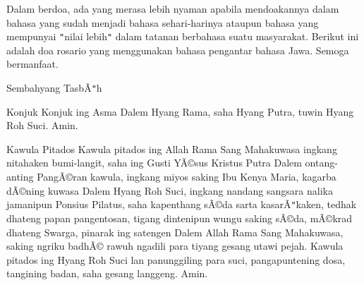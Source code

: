 





Dalam berdoa, ada yang merasa lebih nyaman apabila mendoakannya dalam bahasa yang sudah menjadi bahasa sehari-harinya ataupun bahasa yang mempunyai \texttt{{}"{}}nilai lebih\texttt{{}"{}} dalam tatanan berbahasa suatu masyarakat. Berikut ini adalah doa rosario yang menggunakan bahasa pengantar bahasa Jawa. Semoga bermanfaat.\newline





Sembahyang Tasb\~A\texttt{{}"{}}h



\newline

Konjuk
\newline
Konjuk ing Asma Dalem Hyang Rama, saha Hyang Putra, tuwin Hyang Roh Suci. Amin.\newline

Kawula Pitados
\newline
Kawula pitados ing Allah Rama Sang Mahakuwasa ingkang nitahaken bumi-langit, saha ing Gusti Y\~A\copyright{}sus Kristus Putra Dalem ontang-anting Pang\~A\copyright{}ran kawula, ingkang miyos saking Ibu Kenya Maria, kagarba d\~A\copyright{}ning kuwasa Dalem Hyang Roh Suci, ingkang nandang sangsara nalika jamanipun Ponsius Pilatus, saha kapenthang s\~A\copyright{}da sarta kasar\~A\texttt{{}"{}}kaken, tedhak dhateng papan pangentosan, tigang dintenipun wungu saking s\~A\copyright{}da, m\~A\copyright{}krad dhateng Swarga, pinarak ing satengen Dalem Allah Rama Sang Mahakuwasa, saking ngriku badh\~A\copyright{} rawuh ngadili para tiyang gesang utawi pejah. Kawula pitados ing Hyang Roh Suci lan panunggiling para suci, pangapuntening dosa, tangining badan, saha gesang langgeng. Amin.\newline


